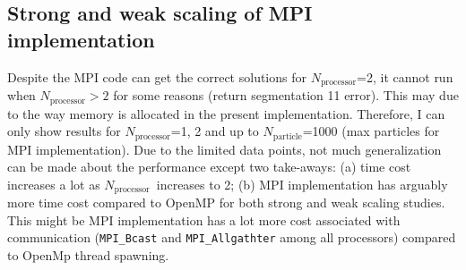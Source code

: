 \documentclass[conference, 10pt]{IEEEtran}
\newcommand{\N}[1]{\ensuremath{N_\text{#1}}}
\newcommand{\Np}{\N{particle}}
\newcommand{\Nproc}{\N{processor}}
\newcommand{\code}[1]{\texttt{\textcolor{BrickRed}{#1}}}
\begin{document}
\subsection{Strong and weak scaling of MPI implementation}
 Despite the MPI code can get the correct solutions for \Nproc=2, it cannot run when $\Nproc > 2$ for some reasons (return segmentation 11 error). 
This may due to the way memory is allocated in the present implementation.
Therefore, I can only show results  for \Nproc=1, 2 and up to \Np=1000 (max particles for MPI implementation).
Due to the limited data points, not much generalization can be made about the performance except two take-aways: (a) time cost increases a lot as \Nproc\ increases to 2; (b) MPI implementation has arguably more time cost compared to OpenMP for both strong and weak scaling studies.
This might be MPI implementation has a lot more cost associated with communication (\code{MPI\_Bcast} and \code{MPI\_Allgathter} among all processors) compared to OpenMp thread spawning.
\end{document}
